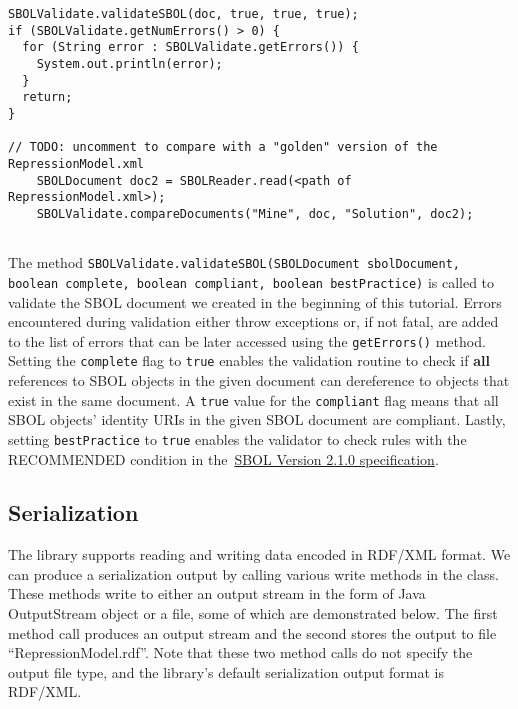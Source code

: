 \vspace{\abovedisplayskip}
\begin{minipage}{0.95\textwidth} 
\begin{lstlisting}
SBOLValidate.validateSBOL(doc, true, true, true);
if (SBOLValidate.getNumErrors() > 0) {
  for (String error : SBOLValidate.getErrors()) {
    System.out.println(error);
  }
  return;
}

// TODO: uncomment to compare with a "golden" version of the RepressionModel.xml
	SBOLDocument doc2 = SBOLReader.read(<path of RepressionModel.xml>);
	SBOLValidate.compareDocuments("Mine", doc, "Solution", doc2);
    
\end{lstlisting}
\end{minipage}

The method
\lstinline+SBOLValidate.validateSBOL(SBOLDocument sbolDocument, boolean complete, boolean compliant, boolean bestPractice)+ 
is called to validate the SBOL document we created in the beginning of
this tutorial. Errors encountered during validation either throw
exceptions or, if not fatal, are added to the list of errors that can
be later accessed using the \lstinline+getErrors()+ method. Setting the \lstinline+complete+
flag to \lstinline+true+ enables the validation routine to check if
{\bf all} references to SBOL objects in the given document can
dereference to objects that exist in the same document. A
\lstinline+true+ value for the \lstinline+compliant+ flag means that
all SBOL objects' identity URIs in the given SBOL document are
compliant. Lastly, setting \lstinline+bestPractice+ to
\lstinline+true+ enables the validator to check rules with the
RECOMMENDED condition in the~\href{http://sbolstandard.org/wp-content/uploads/2016/10/BBF-RFC112-SBOL2.1.0.pdf}{SBOL
  Version 2.1.0 specification}.

\subsection*{Serialization}
The library supports reading and writing data encoded in RDF/XML
format. We can produce a serialization output by
calling various write methods in the 
class. These methods write to either an output stream in the form of
Java OutputStream object or a file, some
of which are demonstrated below. The first method call produces an output
stream and the second stores the output to file
``RepressionModel.rdf''. Note that these two method calls do not
specify the output file type, and the library's default serialization
output format is RDF/XML.


